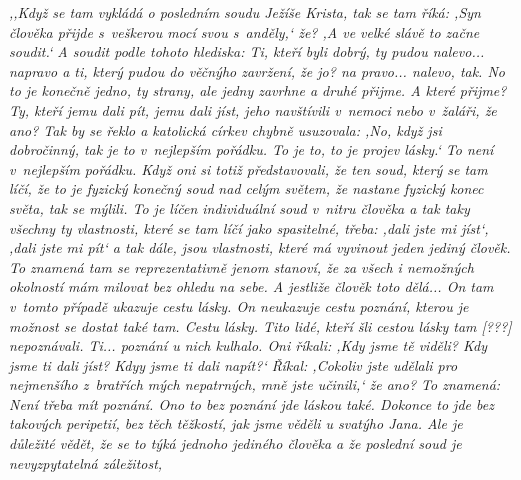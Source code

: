
\textit{%
,,Když se tam vykládá o posledním soudu Ježíše Krista, tak se tam říká: ,Syn
člověka přijde s~veškerou mocí svou s~anděly,` že? ,A ve velké slávě to začne
soudit.` A soudit podle tohoto hlediska: Ti, kteří byli dobrý, ty pudou
nalevo... napravo a ti, který pudou do věčnýho zavržení, že jo? na pravo...
nalevo, tak. No to je konečně jedno, ty strany, ale jedny zavrhne a druhé
přijme. A které přijme? Ty, kteří jemu dali pít, jemu dali jíst, jeho navštívili
v~nemoci nebo v~žaláři, že ano? Tak by se řeklo a katolická církev chybně
usuzovala: ,No, když jsi dobročinný, tak je to v~nejlepším pořádku. To je to, to
je projev lásky.` To není v~nejlepším pořádku. Když oni si totiž představovali,
že ten soud, který se tam líčí, že to je fyzický konečný soud nad celým světem,
že nastane fyzický konec světa, tak se mýlili. To je líčen individuální soud
v~nitru člověka a tak taky všechny ty vlastnosti, které se tam líčí jako
spasitelné, třeba: ,dali jste mi jíst`, ,dali jste mi pít` a tak dále, jsou
vlastnosti, které má vyvinout jeden jediný člověk. To znamená tam se
reprezentativně jenom stanoví, že za všech i nemožných okolností mám milovat bez
ohledu na sebe. A jestliže člověk toto dělá... On tam v~tomto případě ukazuje
cestu lásky. On neukazuje cestu poznání, kterou je možnost se dostat také tam.
Cestu lásky. Tito lidé, kteří šli cestou lásky tam [???] nepoznávali. Ti...
poznání u nich kulhalo. Oni říkali: ,Kdy jsme tě viděli? Kdy jsme ti dali jíst?
Kdyy jsme ti dali napít?` Říkal: ,Cokoliv jste udělali pro nejmenšího z~bratřích
mých nepatrných, mně jste učinili,` že ano? To znamená: Není třeba mít poznání.
Ono to bez poznání jde láskou také. Dokonce to jde bez takových peripetií, bez
těch těžkostí, jak jsme věděli u svatýho Jana. Ale je důležité vědět, že se to
týká jednoho jediného člověka a že poslední soud je nevyzpytatelná záležitost,
}
